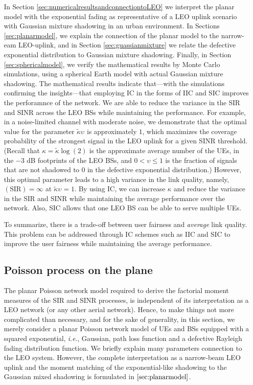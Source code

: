 \documentclass[lettersize,journal]{IEEEtran}
\begin{document}
In Section \ref{sec:numericalresultsandconnectiontoLEO} we interpret the planar model with the exponential fading as representative of a LEO uplink scenario with Gaussian mixture shadowing in an urban environment. In Sections \ref{sec:planarmodel}, we explain the connection of the planar model to the narrow-eam LEO-uplink, and in Section \ref{sec:guassianmixture} we relate the defective exponential distribution to Gaussian mixture shadowing. Finally, in Section \ref{sec:sphericalmodel}, we verify the mathematical results by Monte Carlo simulations, using a spherical Earth model with actual Gaussian mixture shadowing. The mathematical results indicate that---with the simulations confirming the insights---that employing IC in the forms of IIC and SIC improves the perforamnce of the network. We are able to reduce the variance in the SIR and SINR across the LEO BSs while maintaining the performance. For example, in a noise-limited channel with moderate noise, we demonstrate that the optimal value for the parameter $\tilde{\kappa} \upsilon_{}$ is approximately $1$, which maximizes the coverage probability of the strongest signal in the LEO uplink for a given SINR threshold. (Recall that $\kappa=\tilde{\kappa} \log(2)$ is the approximate average number of the UEs, in the $-3$ dB footprints of the LEO BSs, and $0<\upsilon \leq 1$ is the fraction of signals that are not shadowed to $0$ in the defective exponential distribution.) However, this optimal parameter leads to a high variance in the link quality, namely, $(\text{SIR})=\infty$ at $\tilde{\kappa} \upsilon_{}=1$. By using IC, we can increase $\kappa$ and reduce the variance in the SIR and SINR while maintaining the average performance over the network. Also, SIC allows that one LEO BS can be able to serve multiple UEs.

To summarize, there is a trade-off between user fairness and \textit{average} link quality. This problem can be addressed through IC schemes such as IIC and SIC to improve the user fairness while maintaining the average performance.



\subsection{Poisson process on the plane}
\label{sec:gainprocess}

The planar Poisson network model required to derive the factorial moment measures of the SIR and SINR processes, is independent of its interpretation as a LEO network (or any other aerial network). Hence, to make things not more complicated than necessary, and for the sake of generality, in this section, we merely consider a planar Poisson network model of UEs and BSs equipped with a squared exponential, \textit{i.e.}, Gaussian, path loss function and a defective Rayleigh fading distribution function. We briefly explain many parameters connection to the LEO system. However, the complete interpretation as a narrow-beam LEO uplink and the moment matching of the exponential-like shadowing to the Gaussian mixed shadowing  is formulated  in $\ref{sec:planarmodel}$.
\end{document}

